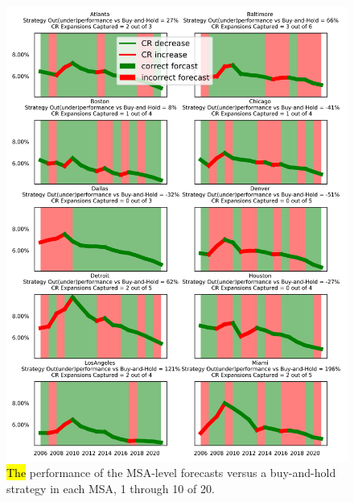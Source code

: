 \documentclass[jrfm,article,accept,oneauthor,pdftex]{Definitions/mdpi}
\begin{document}
\begin{figure}[H]
\includegraphics[scale=.9]{Definitions/mas_graph_1_10.jpg}
\caption{\hl{The} %
 performance of the MSA-level forecasts versus a buy-and-hold strategy in each MSA, 1 through 10 of 20.\label{fig1}}
\end{figure}   %
\unskip
\end{document}
